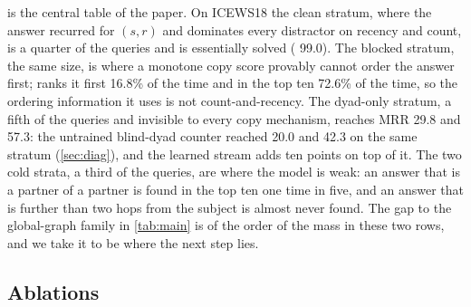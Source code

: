  is the central table of the paper. On ICEWS18 the clean stratum, where the answer recurred for $(s, r)$ and dominates every distractor on recency and count, is a quarter of the queries and is essentially solved (\hten{} 99.0). The blocked stratum, the same size, is where a monotone copy score provably cannot order the answer first; \model{} ranks it first 16.8\% of the time and in the top ten 72.6\% of the time, so the ordering information it uses is not count-and-recency. The dyad-only stratum, a fifth of the queries and invisible to every copy mechanism, reaches MRR 29.8 and \hten{} 57.3: the untrained blind-dyad counter reached 20.0 and 42.3 on the same stratum (\cref{sec:diag}), and the learned stream adds ten points on top of it. The two cold strata, a third of the queries, are where the model is weak: an answer that is a partner of a partner is found in the top ten one time in five, and an answer that is further than two hops from the subject is almost never found. The \hten{} gap to the global-graph family in \cref{tab:main} is of the order of the mass in these two rows, and we take it to be where the next step lies.

\subsection{Ablations}

